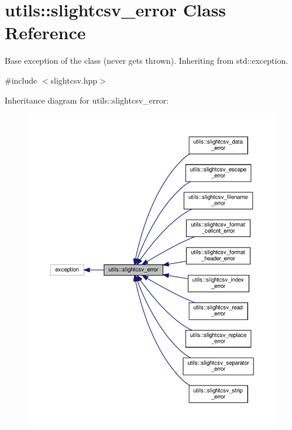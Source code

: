 \hypertarget{classutils_1_1slightcsv__error}{}\section{utils\+:\+:slightcsv\+\_\+error Class Reference}
\label{classutils_1_1slightcsv__error}


Base exception of the class (never gets thrown). Inheriting from std\+::exception.  




{\ttfamily \#include $<$slightcsv.\+hpp$>$}



Inheritance diagram for utils\+:\+:slightcsv\+\_\+error\+:\nopagebreak
\begin{figure}[H]
\begin{center}
\leavevmode
\includegraphics[width=350pt]{classutils_1_1slightcsv__error__inherit__graph}
\end{center}
\end{figure}


